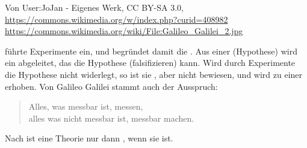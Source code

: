 \begin{frame}
{    {\tiny Von User:JoJan - Eigenes Werk, CC BY-SA 3.0, 
     \url{https://commons.wikimedia.org/w/index.php?curid=408982}
     \url{https://commons.wikimedia.org/wiki/File:Galileo_Galilei_2.jpg}}
  }\parbox[t]{0.69\linewidth}{
   f\"uhrte  
    Experimente ein, und begr\"undet damit die .
  \pause
  Aus einer  (Hypothese) wird ein
   abgeleitet, das die Hypothese
   (falsifizieren) kann.\pause{} Wird durch 
  Experimente die Hypothese nicht widerlegt, so ist sie
  , aber nicht bewiesen, und wird 
  zu einer  erhoben. 
  \pause 
  Von Galileo Galilei stammt auch der Ausspruch:
  \pause
  \begin{quote}
    {Alles, was messbar ist, messen, \\
    alles was nicht messbar ist, 
    messbar machen.}
  \end{quote}
  \pause 
  Nach  ist eine Theorie nur dann
  , wenn sie  ist.
 }
\end{frame}


